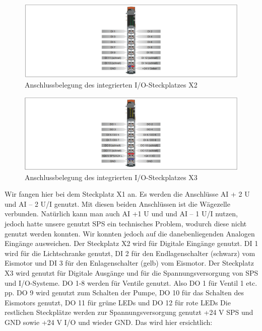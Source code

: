 \documentclass[10pt,a4paper]{report}
\begin{document}
	\begin{figure}[htb]
		\includegraphics[width=1\textwidth]{H2}
		\centering
		\caption{Anschlussbelegung des integrierten I/O-Steckplatzes X2}
	\end{figure}
	\newpage
	\begin{figure}[htb]
		\includegraphics[width=1\textwidth]{H3}
		\centering
		\caption{Anschlussbelegung des integrierten I/O-Steckplatzes X3}
	\end{figure}
	Wir fangen hier bei dem Steckplatz X1 an. 
	Es werden die Anschlüsse AI + 2 U und AI – 2 U/I genutzt. Mit diesen beiden Anschlüssen ist die Wägezelle verbunden. Natürlich kann man auch AI +1 U und und AI – 1 U/I nutzen, jedoch hatte unsere genutzt SPS ein technisches Problem, wodurch diese nicht genutzt werden konnten. Wir konnten jedoch auf die danebenliegenden Analogen Eingänge ausweichen. 	
	Der Steckplatz X2 wird für Digitale Eingänge genutzt. DI 1 wird für die Lichtschranke genutzt, DI 2 für den Endlagenschalter (schwarz) vom Eismotor und DI 3 für den Enlagenschalter (gelb) vom Eismotor. 	
	Der Steckplatz X3 wird genutzt für Digitale Ausgänge und für die Spannungsversorgung von SPS und I/O-Systeme. DO 1-8 werden für Ventile genutzt. Also DO 1 für Ventil 1 etc. pp. DO 9 wird genutzt zum Schalten der Pumpe, DO 10 für das Schalten des Eismotors genutzt, DO 11 für grüne LEDs und DO 12 für rote LEDs Die restlichen Steckplätze werden zur Spannungsversorgung genutzt +24 V SPS und GND sowie +24 V I/O und wieder GND. 
	Das wird hier ersichtlich: \\
	
\end{document}
